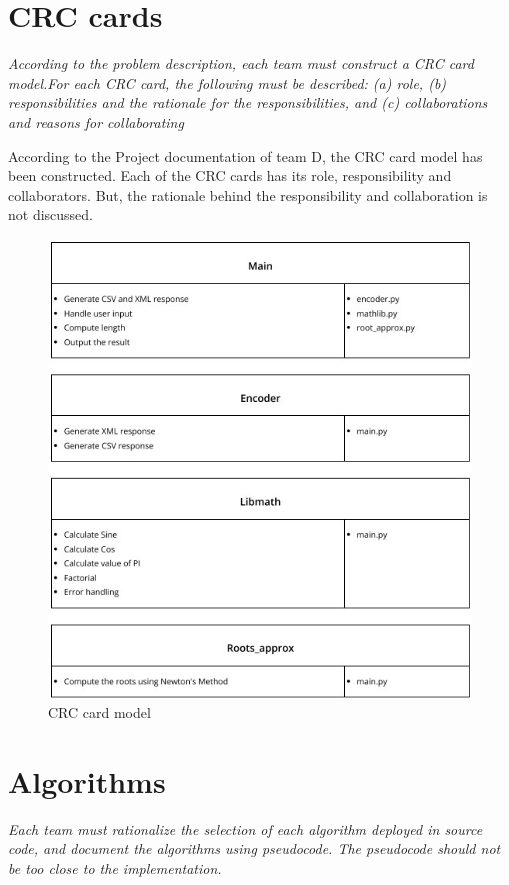 \section{CRC cards}
\begin{flushleft}
  \textit{According to the problem description, each team must construct a CRC card model.For each CRC card, the following must be described: (a) role, (b) responsibilities and the 
rationale for the responsibilities, and (c) collaborations and reasons for collaborating}
\end{flushleft}
\begin{flushleft}
    According to the Project documentation of team D, the CRC card model has been constructed. Each of the CRC cards has its role, responsibility and collaborators. But, the rationale behind the responsibility and collaboration is not discussed. 
\end{flushleft}
\begin{figure}[h!]
    \centering
    \includegraphics[width=.5\linewidth]{resources/crc_card_team_e.jpg}
    \vspace{.5cm}
    \caption{CRC card model}
    \label{fig:CRC card }
  \end{figure}
  \pagebreak
  \section{Algorithms}
\begin{flushleft}
  \textit{Each team must rationalize the selection of each algorithm deployed in source code, and document the 
algorithms using pseudocode. The pseudocode should not be too close to the implementation. }
\end{flushleft}

